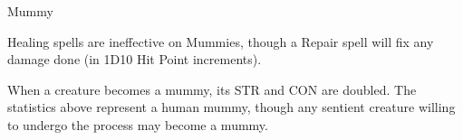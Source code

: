 \begin{monsterbox}{Mummy}
\begin{rpg-monsteraction}[Flammable]
	\end{rpg-monsteraction}
	\begin{rpg-monsteraction}
		Healing spells are ineffective on Mummies, though a Repair spell will fix any damage done (in 1D10 Hit Point increments).
	\end{rpg-monsteraction}
	\begin{rpg-monsteraction}
		When a creature becomes a mummy, its STR and CON are doubled. The statistics above represent a human mummy, though any sentient creature willing to undergo the process may become a mummy.
	\end{rpg-monsteraction}

\end{monsterbox}




